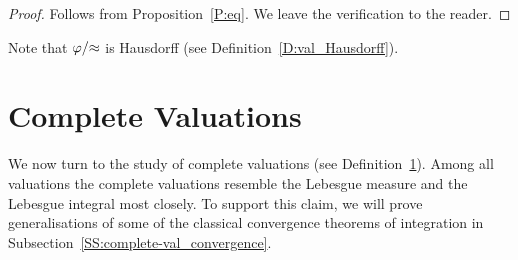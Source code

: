 \documentclass[main.tex]{subfiles}
\begin{document}
\begin{proof}
Follows from Proposition~\ref{P:eq}.
We leave the verification to the reader.
\end{proof}
\begin{rem}
Note that $\varphi/{\approx}$ is Hausdorff 
(see Definition~\ref{D:val_Hausdorff}).
\end{rem}
%
%
%
%
%
%
\section{Complete Valuations}
\label{D:complete-val}
We now turn to the study of complete valuations
(see Definition~\ref{D:complete-val}).
Among all valuations
the complete valuations resemble
the Lebesgue measure
and the Lebesgue integral most closely.
To support this claim,
we will
prove generalisations of
some of the classical convergence theorems of integration
in Subsection~\ref{SS:complete-val_convergence}.

%
%
\end{document}
